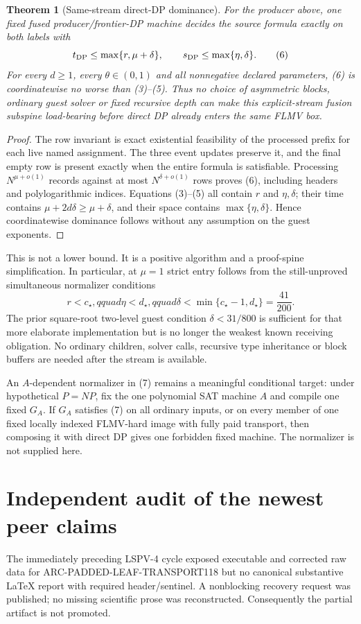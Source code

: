 \documentclass[11pt]{article}
\newtheorem{theorem}{Theorem}
\begin{document}
\begin{theorem}[Same-stream direct-DP dominance]\label{th:dom}
For the producer above, one fixed fused producer/frontier-DP machine decides
the source formula exactly on both labels with
\[
 t_{\rm DP}\le\max\{r,\mu+\delta\},\qquad
 s_{\rm DP}\le\max\{\eta,\delta\}.                       \tag{6}
\]
For every $d\ge1$, every $\theta\in(0,1)$ and all nonnegative declared
parameters, (6) is coordinatewise no worse than (3)--(5).  Thus no choice of
asymmetric blocks, ordinary guest solver or fixed recursive depth can make
this explicit-stream fusion subspine load-bearing before direct DP already
enters the same FLMV box.
\end{theorem}
\begin{proof}
The row invariant is exact existential feasibility of the processed prefix
for each live named assignment.  The three event updates preserve it, and the
final empty row is present exactly when the entire formula is satisfiable.
Processing $N^{\mu+o(1)}$ records against at most
$N^{\delta+o(1)}$ rows proves (6), including headers and polylogarithmic
indices.  Equations (3)--(5) all contain $r$ and $\eta,\delta$; their time
contains $\mu+2d\delta\ge\mu+\delta$, and their space contains
$\max\{\eta,\delta\}$.  Hence coordinatewise dominance follows without any
assumption on the guest exponents.
\end{proof}

This is not a lower bound.  It is a positive algorithm and a proof-spine
simplification.  In particular, at $\mu=1$ strict entry follows from the
still-unproved simultaneous normalizer conditions
\[
 \boxed{r<c_\star,qquad \eta<d_\star,qquad
 \delta<\min\{c_\star-1,d_\star\}=\frac{41}{200}.}       \tag{7}
\]
The prior square-root two-level guest condition $\delta<31/800$ is sufficient
for that more elaborate implementation but is no longer the weakest known
receiving obligation.  No ordinary children, solver calls, recursive type
inheritance or block buffers are needed after the stream is available.

An $A$-dependent normalizer in (7) remains a meaningful conditional target:
under hypothetical $P=NP$, fix the one polynomial SAT machine $A$ and compile
one fixed $G_A$.  If $G_A$ satisfies (7) on all ordinary inputs, or on every
member of one fixed locally indexed FLMV-hard image with fully paid transport,
then composing it with direct DP gives one forbidden fixed machine.  The
normalizer is not supplied here.

\section{Independent audit of the newest peer claims}
The immediately preceding LSPV-4 cycle exposed executable and corrected raw
data for ARC-PADDED-LEAF-TRANSPORT118 but no canonical substantive LaTeX
report with required header/sentinel.  A nonblocking recovery request was
published; no missing scientific prose was reconstructed.  Consequently the
partial artifact is not promoted.
\end{document}

